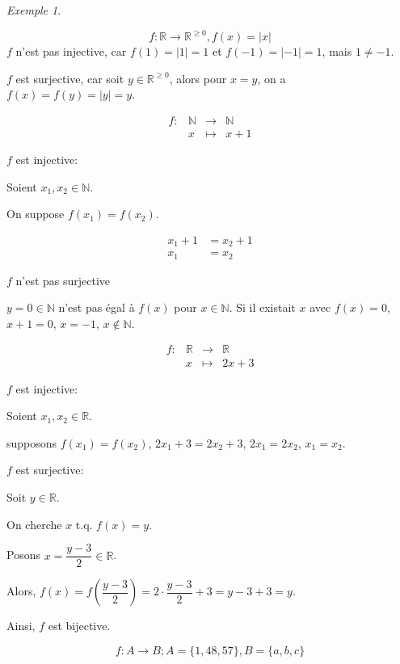 \documentclass{report}
\newcommand*{\abs}[1]{\left| #1 \right|}
\newcommand*{\gte}{\geqslant}
\newcommand*{\reels}{\mathbb{R}}
\newcommand*{\naturels}{\mathbb{N}}
\theoremstyle{definition}
\theoremstyle{remark}
\newtheorem*{exem}{Exemple}
\begin{document}
	\begin{exem}~

		\begin{ulist}
			\item
			\[
			f:\reels \to \reels^{\gte0}, f(x)=\abs{x}
			\]
			$f$ n'est pas injective, car $f(1)=\abs{1}=1$ et $f(-1)=\abs{-1}=1$, mais $1 \neq -1$.

			$f$ est surjective, car soit $y \in \reels^{\gte0}$, alors pour $x=y$, on a $f(x)=f(y)=\abs{y}=y$.

			\item
			\[
			\begin{array}{rrcl}
				f:&\naturels&\to&\naturels\\
				&x&\mapsto&x+1
			\end{array}
			\]

			$f$ est injective:

			Soient $x_1,x_2 \in \naturels$.

			On suppose $f(x_1)=f(x_2)$.

			\begin{align*}
				x_1+1&= x_2+1\\
				x_1&= x_2
			\end{align*}

			$f$ n'est pas surjective

			$y=0\in\naturels$ n'est pas \'egal \`a $f(x)$ pour $x\in\naturels$. Si il existait $x$ avec $f(x)=0$, $x+1=0$, $x=-1$, $x \not\in \naturels$.

			\item
			\[
			\begin{array}{rrcl}
				f:&\reels&\to&\reels\\
				&x&\mapsto&2x+3
			\end{array}
			\]

			$f$ est injective:

			Soient $x_1,x_2 \in \reels$.

			supposons $f(x_1)=f(x_2)$, $2x_1+3=2x_2+3$, $2x_1=2x_2$, $x_1=x_2$.

			$f$ est surjective:

			Soit $y \in \reels$.

			On cherche $x$ t.q. $f(x)=y$.

			Posons $x=\dfrac{y-3}{2} \in \reels$.

			Alors, $f(x) = f\left( \dfrac{y-3}{2} \right) = 2 \cdot  \dfrac{y-3}{2} + 3 = y-3+3 = y$.

			Ainsi, $f$ est bijective.

			\item
			\[
			f:A \to B; A=\{1,48,57\}, B=\{a,b,c\}
			\]


\end{ulist}
\end{exem}
\end{document}
